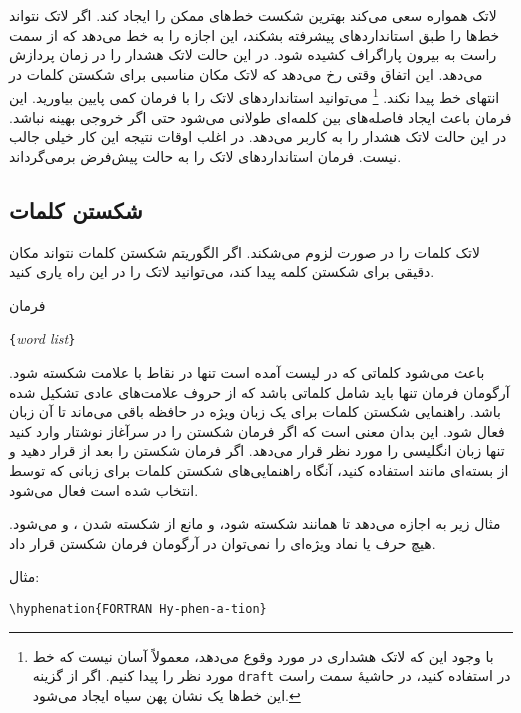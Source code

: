 لاتک همواره سعی می‌کند بهترین شکست‌ خط‌های ممکن را ایجاد کند. اگر لاتک نتواند خط‌ها را طبق استانداردهای پیشرفته بشکند، این اجازه را به 
خط می‌دهد که  از سمت راست به بیرون پاراگراف کشیده شود. در این حالت لاتک هشدار  را در زمان پردازش می‌دهد. این اتفاق وقتی رخ می‌دهد که لاتک مکان مناسبی برای شکستن کلمات در انتهای خط پیدا نکند.%
\footnote{با وجود این که لاتک هشداری در مورد وقوع  می‌دهد، معمولاً آسان نیست که خط مورد نظر را پیدا کنیم. اگر از گزینه \texttt{draft} در  
استفاده کنید، در حاشیهٔ سمت راست این خط‌ها یک نشان پهن سیاه‌ ایجاد می‌شود.}
می‌توانید استاندارد‌های لاتک را با فرمان   کمی پایین بیاورید. این فرمان باعث ایجاد فاصله‌های بین کلمه‌ای طولانی می‌شود 
حتی اگر خروجی بهینه نباشد. در این حالت لاتک هشدار   را به کاربر می‌دهد. در اغلب اوقات نتیجه این کار خیلی جالب نیست. فرمان  استاندارد‌های لاتک را به حالت پیش‌فرض برمی‌گرداند.
\subsection{شکستن کلمات} \label{hyph}

لاتک کلمات را در صورت لزوم می‌شکند. اگر الگوریتم شکستن کلمات نتواند مکان دقیقی برای شکستن کلمه پیدا کند، می‌توانید لاتک را در این راه یاری کنید.

فرمان 
\begin{lscommand}
\verb|{|\emph{word list}\verb|}|
\end{lscommand}
\noindent 
باعث می‌شود کلماتی که در لیست آمده است تنها در نقاط با علامت   شکسته شود. آرگومان فرمان تنها باید شامل کلماتی باشد که از حروف علامت‌های عادی تشکیل شده باشد. راهنمایی شکستن کلمات برای یک زبان ویژه در حافظه باقی می‌ماند تا آن زبان فعال شود. این بدان معنی است که اگر فرمان شکستن را در سرآغاز نوشتار وارد کنید تنها زبان انگلیسی را مورد نظر قرار می‌دهد. اگر فرمان شکستن را بعد از  \verb|| قرار دهید و از بسته‌ای مانند  استفاده کنید، آنگاه راهنمایی‌های شکستن کلمات برای زبانی که توسط  انتخاب شده است فعال می‌شود.

مثال زیر به   اجازه می‌دهد تا همانند  شکسته شود، و مانع از شکسته‌ شدن ،  و  می‌شود. هیچ حرف یا نماد ویژه‌ای را نمی‌توان در آرگومان فرمان شکستن قرار داد.

مثال:
\begin{code}
\verb|\hyphenation{FORTRAN Hy-phen-a-tion}|
\end{code}


